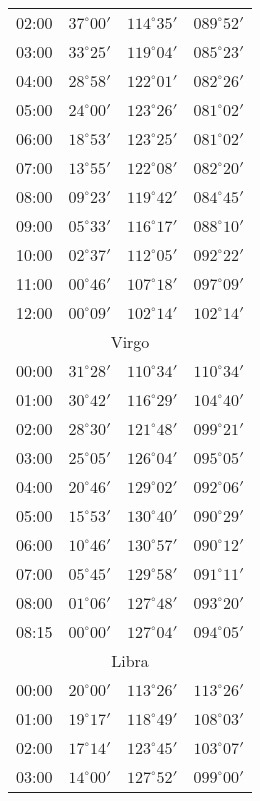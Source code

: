 \begin{table}
\begin{Parallel}{}{}
{{\begin{tabular}{l|lll}
02:00 & $37^\circ 00'$ & $114^\circ 35'$& $089^\circ 52'$ \\
03:00 & $33^\circ 25'$ & $119^\circ 04'$& $085^\circ 23'$ \\
04:00 & $28^\circ 58'$ & $122^\circ 01'$& $082^\circ 26'$ \\
05:00 & $24^\circ 00'$ & $123^\circ 26'$& $081^\circ 02'$ \\
06:00 & $18^\circ 53'$ & $123^\circ 25'$& $081^\circ 02'$ \\
07:00 & $13^\circ 55'$ & $122^\circ 08'$& $082^\circ 20'$ \\
08:00 & $09^\circ 23'$ & $119^\circ 42'$& $084^\circ 45'$ \\
09:00 & $05^\circ 33'$ & $116^\circ 17'$& $088^\circ 10'$ \\
10:00 & $02^\circ 37'$ & $112^\circ 05'$& $092^\circ 22'$ \\
11:00 & $00^\circ 46'$ & $107^\circ 18'$& $097^\circ 09'$ \\
12:00 & $00^\circ 09'$ & $102^\circ 14'$& $102^\circ 14'$ \\
\multicolumn{4}{c}{Virgo}\\
00:00 & $31^\circ 28'$ & $110^\circ 34'$& $110^\circ 34'$ \\
01:00 & $30^\circ 42'$ & $116^\circ 29'$& $104^\circ 40'$ \\
02:00 & $28^\circ 30'$ & $121^\circ 48'$& $099^\circ 21'$ \\
03:00 & $25^\circ 05'$ & $126^\circ 04'$& $095^\circ 05'$ \\
04:00 & $20^\circ 46'$ & $129^\circ 02'$& $092^\circ 06'$ \\
05:00 & $15^\circ 53'$ & $130^\circ 40'$& $090^\circ 29'$ \\
06:00 & $10^\circ 46'$ & $130^\circ 57'$& $090^\circ 12'$ \\
07:00 & $05^\circ 45'$ & $129^\circ 58'$& $091^\circ 11'$ \\
08:00 & $01^\circ 06'$ & $127^\circ 48'$& $093^\circ 20'$ \\
08:15 & $00^\circ 00'$ & $127^\circ 04'$& $094^\circ 05'$ \\
\multicolumn{4}{c}{Libra}\\
00:00 & $20^\circ 00'$ & $113^\circ 26'$& $113^\circ 26'$ \\
01:00 & $19^\circ 17'$ & $118^\circ 49'$& $108^\circ 03'$ \\
02:00 & $17^\circ 14'$ & $123^\circ 45'$& $103^\circ 07'$ \\
03:00 & $14^\circ 00'$ & $127^\circ 52'$& $099^\circ 00'$ \\

\end{tabular}}}
\end{Parallel}
\end{table}
